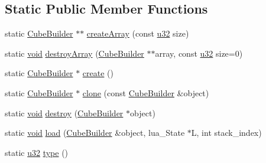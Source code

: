 \subsection*{Static Public Member Functions}
\begin{DoxyCompactItemize}
\item 
static \mbox{\hyperlink{classnjli_1_1_cube_builder}{Cube\+Builder}} $\ast$$\ast$ \mbox{\hyperlink{classnjli_1_1_cube_builder_ad7a6e18215ce2df88ec74502725c4e83}{create\+Array}} (const \mbox{\hyperlink{_util_8h_a10e94b422ef0c20dcdec20d31a1f5049}{u32}} size)
\item 
static \mbox{\hyperlink{_thread_8h_af1e856da2e658414cb2456cb6f7ebc66}{void}} \mbox{\hyperlink{classnjli_1_1_cube_builder_af06e4e2f2eda9d656e115cde6bcc52a4}{destroy\+Array}} (\mbox{\hyperlink{classnjli_1_1_cube_builder}{Cube\+Builder}} $\ast$$\ast$array, const \mbox{\hyperlink{_util_8h_a10e94b422ef0c20dcdec20d31a1f5049}{u32}} size=0)
\item 
static \mbox{\hyperlink{classnjli_1_1_cube_builder}{Cube\+Builder}} $\ast$ \mbox{\hyperlink{classnjli_1_1_cube_builder_ad35c9d6eef7138613a33e726d91d6ea7}{create}} ()
\item 
static \mbox{\hyperlink{classnjli_1_1_cube_builder}{Cube\+Builder}} $\ast$ \mbox{\hyperlink{classnjli_1_1_cube_builder_a8efc6aa59541a7f5f7ca61161e74c0a4}{clone}} (const \mbox{\hyperlink{classnjli_1_1_cube_builder}{Cube\+Builder}} \&object)
\item 
static \mbox{\hyperlink{_thread_8h_af1e856da2e658414cb2456cb6f7ebc66}{void}} \mbox{\hyperlink{classnjli_1_1_cube_builder_ab2580dcc82092bb1b89e7502c968cd70}{destroy}} (\mbox{\hyperlink{classnjli_1_1_cube_builder}{Cube\+Builder}} $\ast$object)
\item 
static \mbox{\hyperlink{_thread_8h_af1e856da2e658414cb2456cb6f7ebc66}{void}} \mbox{\hyperlink{classnjli_1_1_cube_builder_ae870b598776cd9e82a43575fd0e4598e}{load}} (\mbox{\hyperlink{classnjli_1_1_cube_builder}{Cube\+Builder}} \&object, lua\+\_\+\+State $\ast$L, int stack\+\_\+index)
\item 
static \mbox{\hyperlink{_util_8h_a10e94b422ef0c20dcdec20d31a1f5049}{u32}} \mbox{\hyperlink{classnjli_1_1_cube_builder_a441cbddc56597d9bee9e9334bcf78762}{type}} ()
\end{DoxyCompactItemize}
